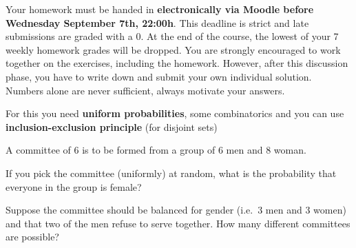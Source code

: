 \documentclass[a4paper,10pt,landscape,twocolumn]{scrartcl}
\newcommand\deadline{Wednesday September 7th, 22:00h}
\begin{document}
\homeworkproblems

{\sffamily\noindent
Your homework must be handed in \textbf{electronically via Moodle before \deadline}. This deadline is strict and late submissions are graded with a 0. At the end of the course, the lowest of your 7 weekly homework grades will be dropped. You are strongly encouraged to work together on the exercises, including the homework. However, after this discussion phase, you have to write down and submit your own individual solution. Numbers alone are never sufficient, always motivate your answers.
}

	
\begin{exercise}[Committees (3pt)]
	\begin{mycomment}
		For this you need \textbf{uniform probabilities}, some combinatorics and you can use \textbf{inclusion-exclusion principle} (for disjoint sets)
	\end{mycomment}

	A committee of 6 is to be formed from a group of 6 men and 8 woman.

	\begin{subex}[1pt]
	If you pick the committee (uniformly) at random, what is the probability that everyone in the group is female?
	\end{subex}

	\begin{subex}[2pt]
		Suppose the committee should be balanced for gender
                (i.e.\ 3 men and 3 women) and that two of the men refuse to serve together. How many different committees are possible?
	\end{subex}
\end{exercise}
\end{document}
